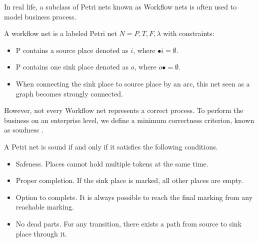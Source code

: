In real life, a subclass of Petri nets known as Workflow nets is often used to model business process.
\begin{definition}
	A workflow net is a labeled Petri net $N={P,T,F,\lambda}$ with constraints: 
	\begin{itemize}
		\itemsep-0.5em 
		\item P contains a source place denoted as $i$, where $ \bullet i=\emptyset$.
		\item P contains one sink place denoted as $o$, where $ o\bullet =\emptyset$.
		\item When connecting the sink place to source place by an arc, this net seen as a graph becomes strongly connected.
	\end{itemize}
\end{definition}   
However, not every Workflow net represents a correct process. To perform the business on an enterprise level, we define a minimum correctness criterion, known as soudness \cite{van2006structural}. 
\begin{definition}[Soundness]
	A Petri net is sound if and only if it satisfies the following conditions.
	\begin{itemize}
		\itemsep-0.5em 
		\item Safeness. Places cannot hold multiple tokens at the same time.
		\item Proper completion. If the sink place is marked, all other places are empty.
		\item Option to complete. It is always possible to reach the final marking from any reachable marking.
		\item No dead parts. For any transition, there exists a path from source to sink place through it. 
	\end{itemize}
\end{definition}
